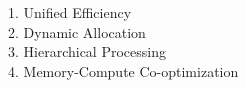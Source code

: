 \documentclass[preview]{standalone}
\begin{document}
1. Unified Efficiency\\2. Dynamic Allocation\\3. Hierarchical Processing\\4. Memory-Compute Co-optimization\\
\end{document}
